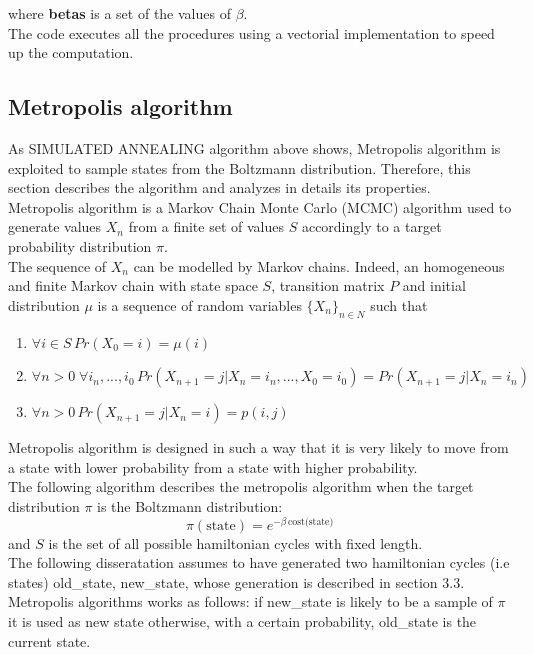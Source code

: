 \documentclass{article}
\begin{document}
\noindent where \textbf{betas} is a set of the values of $\beta$. \\ 
The code executes all the procedures using a vectorial implementation to speed up the computation.

\subsection{Metropolis algorithm}
As SIMULATED ANNEALING algorithm above shows, Metropolis  algorithm is exploited to sample states from the Boltzmann distribution. Therefore, this section describes the algorithm and analyzes in details its properties.\\
Metropolis algorithm is a Markov Chain Monte Carlo (MCMC) algorithm used to generate values $X_n$ from a finite set of values $S$ accordingly to a target probability distribution $\pi$.  \\
The sequence of  $X_n$ can be modelled by Markov chains. Indeed, an homogeneous and finite Markov chain with state space $S$, transition matrix $P$ and initial distribution $\mu$ is a sequence of random variables $\{ X_n \}_{n \in N}$ such that
\begin{enumerate}
\item $\forall i \in S \, Pr(X_0=i)= \mu(i)$ 
\item $\forall n > 0 \; \forall i_n,...,i_0 \,  Pr(X_{n+1} = j | X_n = i_n,..., X_0=i_0) = Pr(X_{n+1} = j | X_n = i_n)$
\item $\forall n > 0 \, Pr(X_{n+1} = j | X_n = i) = p(i,j) $
\end{enumerate}
Metropolis algorithm is designed in such a way that it is very likely to move from a state with lower probability from a state with higher probability. \\
The following algorithm describes the metropolis algorithm when the target distribution $\pi$ is the Boltzmann distribution:
\begin{equation*}
\pi(\text{state}) = e^{- \beta \, \text{cost(state)}}
\end{equation*}
and $S$ is the set of all possible hamiltonian cycles with fixed length.\\
The following disseratation assumes to have generated two hamiltonian cycles (i.e states) old\_state, new\_state, whose generation is described in  section 3.3. Metropolis algorithms works as follows: if new\_state is likely to be a sample of $\pi$ it is used as new state otherwise, with a certain probability, old\_state is the current state.
\end{document}
